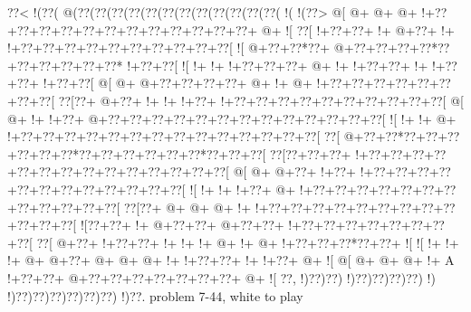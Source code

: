 \vbox{\vbox{\goo
\0??<\- !(\0??(\- @(\0??(\0??(\0??(\0??(\0??(\0??(\0??(\0??(\0??(\0??(\0??(\0??(\- !(\- !(\0??>
\- @[\- @+\- @+\- @+\- !+\0??+\0??+\0??+\0??+\0??+\0??+\0??+\0??+\0??+\0??+\0??+\0??+\- @+\- ![
\0??[\- !+\0??+\0??+\- !+\- @+\0??+\- !+\- !+\0??+\0??+\0??+\0??+\0??+\0??+\0??+\0??+\0??+\0??[
\- ![\- @+\0??+\0??*\0??+\- @+\0??+\0??+\0??+\0??*\0??+\0??+\0??+\0??+\0??+\0??*\- !+\0??+\0??[
\- ![\- !+\- !+\- !+\0??+\0??+\0??+\- @+\- !+\- !+\0??+\0??+\- !+\- !+\0??+\0??+\- !+\0??+\0??[
\- @[\- @+\- @+\0??+\0??+\0??+\0??+\- @+\- !+\- @+\- !+\0??+\0??+\0??+\0??+\0??+\0??+\0??+\0??[
\0??[\0??+\- @+\0??+\- !+\- !+\- !+\0??+\- !+\0??+\0??+\0??+\0??+\0??+\0??+\0??+\0??+\0??+\0??[
\- @[\- @+\- !+\- !+\0??+\- @+\0??+\0??+\0??+\0??+\0??+\0??+\0??+\0??+\0??+\0??+\0??+\0??+\0??[
\- ![\- !+\- !+\- @+\- !+\0??+\0??+\0??+\0??+\0??+\0??+\0??+\0??+\0??+\0??+\0??+\0??+\0??+\0??[
\0??[\- @+\0??+\0??*\0??+\0??+\0??+\0??+\0??+\0??*\0??+\0??+\0??+\0??+\0??+\0??*\0??+\0??+\0??[
\0??[\0??+\0??+\0??+\- !+\0??+\0??+\0??+\0??+\0??+\0??+\0??+\0??+\0??+\0??+\0??+\0??+\0??+\0??[
\- @[\- @+\- @+\0??+\- !+\0??+\- !+\0??+\0??+\0??+\0??+\0??+\0??+\0??+\0??+\0??+\0??+\0??+\0??[
\- ![\- !+\- !+\- !+\0??+\- @+\- !+\0??+\0??+\0??+\0??+\0??+\0??+\0??+\0??+\0??+\0??+\0??+\0??[
\0??[\0??+\- @+\- @+\- @+\- !+\- !+\0??+\0??+\0??+\0??+\0??+\0??+\0??+\0??+\0??+\0??+\0??+\0??[
\- ![\0??+\0??+\- !+\- @+\0??+\0??+\- @+\0??+\0??+\- !+\0??+\0??+\0??+\0??+\0??+\0??+\0??+\0??[
\0??[\- @+\0??+\- !+\0??+\0??+\- !+\- !+\- !+\- @+\- !+\- @+\- !+\0??+\0??+\0??*\0??+\0??+\- ![
\- ![\- !+\- !+\- !+\- @+\- @+\0??+\- @+\- @+\- @+\- !+\- !+\0??+\0??+\- !+\- !+\0??+\- @+\- ![
\- @[\- @+\- @+\- @+\- !+\!  A\- !+\0??+\0??+\- @+\0??+\0??+\0??+\0??+\0??+\0??+\0??+\- @+\- ![
\0??,\- !)\0??)\0??)\- !)\0??)\0??)\0??)\0??)\- !)\- !)\0??)\0??)\0??)\0??)\0??)\0??)\- !)\0??.
}
\hfil problem 7-44, white to play\hfil\break
}

